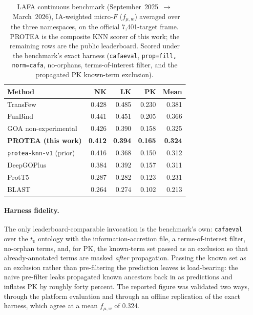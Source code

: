 \begin{table}[htbp]
  \centering
  \caption[LAFA continuous benchmark: IA-weighted micro-$F$ (7,401-target frame)]{%
    LAFA continuous benchmark (September~2025~$\to$~March~2026), IA-weighted
    micro-$F$ ($f_{\mu,w}$) averaged over the three namespaces, on the official
    7{,}401-target frame. PROTEA is the composite KNN scorer of this work; the
    remaining rows are the public leaderboard. Scored under the benchmark's exact
    harness (\texttt{cafaeval}, \texttt{prop=fill, norm=cafa}, no-orphans,
    terms-of-interest filter, and the propagated PK known-term exclusion).}
  \label{tab:exp12-lafa}
  \begin{tabular}{l rrr r}
    \toprule
    \textbf{Method} & \textbf{NK} & \textbf{LK} & \textbf{PK} & \textbf{Mean} \\
    \midrule
    TransFew                       & 0.428 & 0.485 & 0.230 & 0.381 \\
    FunBind                        & 0.441 & 0.451 & 0.205 & 0.366 \\
    GOA non-experimental           & 0.426 & 0.390 & 0.158 & 0.325 \\
    \textbf{PROTEA (this work)}    & \textbf{0.412} & \textbf{0.394} & \textbf{0.165} & \textbf{0.324} \\
    \texttt{protea-knn-v1} (prior) & 0.416 & 0.368 & 0.150 & 0.312 \\
    DeepGOPlus                     & 0.384 & 0.392 & 0.157 & 0.311 \\
    ProtT5                         & 0.287 & 0.282 & 0.123 & 0.231 \\
    BLAST                          & 0.264 & 0.274 & 0.102 & 0.213 \\
    \bottomrule
  \end{tabular}
\end{table}

\paragraph{Harness fidelity.}
The only leaderboard-comparable invocation is the benchmark's own: \texttt{cafaeval}
over the $t_0$ ontology with the information-accretion file, a terms-of-interest
filter, no-orphan terms, and, for PK, the known-term set passed as an exclusion so
that already-annotated terms are masked \emph{after} propagation. Passing the known
set as an exclusion rather than pre-filtering the prediction leaves is load-bearing:
the naive pre-filter leaks propagated known ancestors back in as predictions and
inflates PK by roughly forty percent. The reported figure was validated two ways,
through the platform evaluation and through an offline replication of the exact
harness, which agree at a mean $f_{\mu,w}$ of 0.324.


